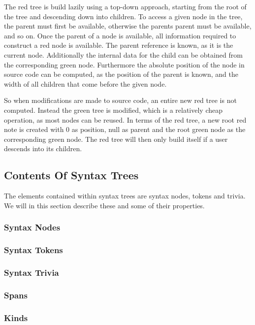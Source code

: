 The red tree is build lazily using a top-down approach, starting from the root of the tree and descending down into children. To access a given node in the tree, the parent must first be available, otherwise the parents parent must be available, and so on. Once the parent of a node is available, all information required to construct a red node is available. The parent reference is known, as it is the current node. Additionally the internal data for the child can be obtained from the corresponding green node. Furthermore the absolute position of the node in source code can be computed, as the position of the parent is known, and the width of all children that come before the given node\cite{sadovRoslynPerf}.

So when modifications are made to source code, an entire new red tree is not computed. Instead the green tree is modified, which is a relatively cheap operation, as most nodes can be reused. In terms of the red tree, a new root red note is created with 0 as position, null as parent and the root green node as the corresponding green node. The red tree will then only build itself if a user descends into its children\cite{sadovRoslynPerf}. %


\subsection{Contents Of Syntax Trees}
The elements contained within syntax trees are syntax nodes, tokens and trivia. We will in this section describe these and some of their properties.

\subsubsection{Syntax Nodes}
\subsubsection{Syntax Tokens}
\subsubsection{Syntax Trivia}
\subsubsection{Spans}
\subsubsection{Kinds}
